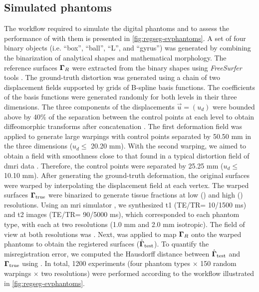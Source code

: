 \subsection{Simulated phantoms}\label{sec:regseg-digital_phantoms}
The workflow required to simulate the digital phantoms and to assess the performance of
  \regseg{} with them is presented in \autoref{fig:regseg-evphantoms}.
A set of four binary objects (i.e. ``box'', ``ball'', ``L'',
  and ``gyrus'') was generated by combining the binarization of
  analytical shapes and mathematical morphology.
The reference surfaces $\boldsymbol{\Gamma}_R$ were extracted from the binary shapes
  using \emph{FreeSurfer} tools \citep{fischl_freesurfer_2012}.
The ground-truth distortion was generated using a chain of two displacement
  fields supported by grids of B-spline basis functions.
The coefficients of the basis functions were generated randomly for
  both levels in their three dimensions.
The three components of the displacements $\vec{u} = (u_d)$
  were bounded above by 40\% of the separation between the control points
  at each level to obtain diffeomorphic transforms
  after concatenation \citep{rueckert_diffeomorphic_2006}.
The first deformation field was applied to generate large warpings
  with control points separated by 50.50 mm in the three dimensions
  ($u_d\leq$ 20.20 mm).
With the second warping, we aimed to obtain a field with smoothness
  close to that found in a typical distortion field of \gls*{dmri} data
  \citep{irfanoglu_susceptibility_2011}.
Therefore, the control points were separated by 25.25 mm ($u_d\leq$ 10.10 mm).
After generating the ground-truth deformation, the original surfaces
  were warped by interpolating the displacement field at each vertex.
The warped surfaces $\boldsymbol{\Gamma}_\text{true}$ were binarized to generate tissue fractions
  at low () and high () resolutions.
Using an \acrshort*{mri} simulator \citep{caruyer_phantomas_2014}, we synthesized
  \gls*{t1} (TE/TR= 10/1500 ms) and \gls*{t2} images (TE/TR= 90/5000 ms), which
  corresponded to each phantom type, with each at two resolutions
  (1.0 mm and 2.0 mm isotropic).
The field of view at both resolutions was .
Next, \regseg{} was applied to map $\boldsymbol{\Gamma}_R$ onto the warped phantoms to
  obtain the registered surfaces ($\hat{\boldsymbol{\Gamma}}_\text{test}$).
To quantify the misregistration error, we computed the Hausdorff distance between
 $\hat{\boldsymbol{\Gamma}}_\text{test}$ and $\boldsymbol{\Gamma}_\text{true}$ using \citep{commandeur_vtk_2011}.
In total, 1200 experiments (four phantom types $\times$ 150 random warpings $\times$ two resolutions) were
  performed according to the workflow illustrated in \autoref{fig:regseg-evphantoms}.


